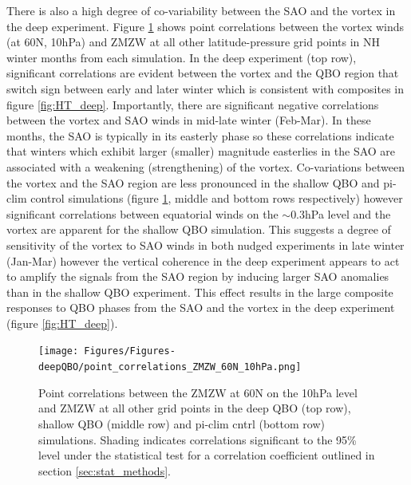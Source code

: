 There is also a high degree of co-variability between the SAO and the vortex in the deep experiment. Figure \ref{fig:point_cors} shows point correlations between the vortex winds (at 60N, 10hPa) and ZMZW at all other latitude-pressure grid points in NH winter months from each simulation. In the deep experiment (top row), significant correlations are evident between the vortex and the QBO region that switch sign between early and later winter which is consistent with composites in figure \ref{fig:HT_deep}. Importantly, there are significant negative correlations between the vortex and SAO winds in mid-late winter (Feb-Mar). In these months, the SAO is typically in its easterly phase so these correlations indicate that winters which exhibit larger (smaller) magnitude easterlies in the SAO are associated with a weakening (strengthening) of the vortex. Co-variations between the vortex and the SAO region are less pronounced in the shallow QBO and pi-clim control simulations (figure \ref{fig:point_cors}, middle and bottom rows respectively) however significant correlations between equatorial winds on the $\sim$0.3hPa level and the vortex are apparent for the shallow QBO simulation. This suggests a degree of sensitivity of the vortex to SAO winds in both nudged experiments in late winter (Jan-Mar) however the vertical coherence in the deep experiment appears to act to amplify the signals from the SAO region by inducing larger SAO anomalies than in the shallow QBO experiment. This effect results in the large composite responses to QBO phases from the SAO and the vortex in the deep experiment (figure \ref{fig:HT_deep}).

\begin{figure}[h!]
\begin{center}
\noindent\texttt{[image: Figures/Figures-deepQBO/point\_correlations\_ZMZW\_60N\_10hPa.png]}
\caption[]{Point correlations between the ZMZW at 60N on the 10hPa level and ZMZW at all other grid points in the deep QBO (top row), shallow QBO (middle row) and pi-clim cntrl (bottom row) simulations. Shading indicates correlations significant to the 95\% level under the statistical test for a correlation coefficient outlined in section \ref{sec:stat_methods}.}
\label{fig:point_cors}
\end{center}
\end{figure}

